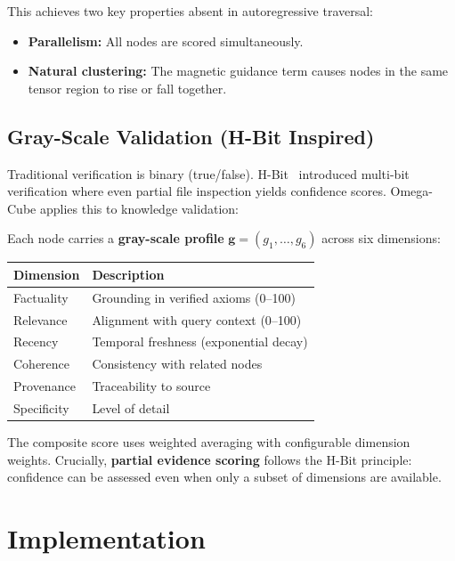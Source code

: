 \documentclass[11pt,a4paper]{article}
\begin{document}
This achieves two key properties absent in autoregressive traversal:
\begin{itemize}[leftmargin=*,itemsep=0pt]
    \item \textbf{Parallelism:} All nodes are scored simultaneously.
    \item \textbf{Natural clustering:} The magnetic guidance term causes nodes in the same tensor region to rise or fall together.
\end{itemize}

\subsection{Gray-Scale Validation (H-Bit Inspired)}

Traditional verification is binary (true/false). H-Bit~\cite{hbit} introduced multi-bit verification where even partial file inspection yields confidence scores. Omega-Cube applies this to knowledge validation:

Each node carries a \textbf{gray-scale profile} $\mathbf{g} = (g_1, \ldots, g_6)$ across six dimensions:

\begin{center}
\begin{tabular}{ll}
\toprule
Dimension & Description \\
\midrule
Factuality & Grounding in verified axioms (0--100) \\
Relevance & Alignment with query context (0--100) \\
Recency & Temporal freshness (exponential decay) \\
Coherence & Consistency with related nodes \\
Provenance & Traceability to source \\
Specificity & Level of detail \\
\bottomrule
\end{tabular}
\end{center}

The composite score uses weighted averaging with configurable dimension weights. Crucially, \textbf{partial evidence scoring} follows the H-Bit principle: confidence can be assessed even when only a subset of dimensions are available.

\section{Implementation}
\end{document}
